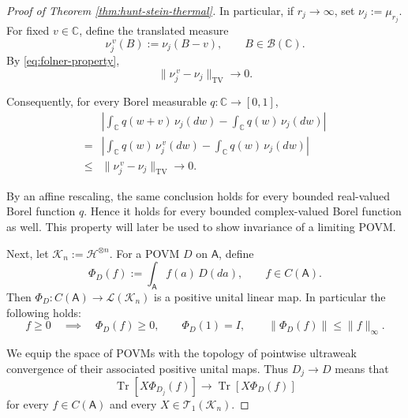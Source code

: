 \documentclass{article}
\theoremstyle{named}
\theoremstyle{named1}
\newcommand{\Tr}{\operatorname{Tr}}
\newcommand{\bbC}{\mathbb C}
\newcommand{\cH}{\mathcal H}
\theoremstyle{plain}
\theoremstyle{remark}
\begin{document}
\begin{proof}[Proof of Theorem \ref{thm:hunt-stein-thermal}]
In particular, if \(r_j\to\infty\), set
\(\nu_j:=\mu_{r_j}\). For fixed \(v\in\bbC\), define the translated
measure
\[
    \nu_j^{\,v}(B):=\nu_j(B-v),
    \qquad B\in\mathcal B(\bbC).
\]
By \eqref{eq:folner-property},
\[
    \|\nu_j^{\,v}-\nu_j\|_{\mathrm{TV}}
    \rightarrow0.
\]

Consequently, for every Borel measurable
\(q:\bbC\to[0,1]\),
\begin{align}
&\left|
    \int_{\bbC}q(w+v)\,\nu_j(dw)
    -
    \int_{\bbC}q(w)\,\nu_j(dw)
\right|
\nonumber\\
=&
\left|
    \int_{\bbC}q(w)\,\nu_j^{\,v}(dw)
    -
    \int_{\bbC}q(w)\,\nu_j(dw)
\right|
\nonumber\\
\leq &
\|\nu_j^{\,v}-\nu_j\|_{\mathrm{TV}}
\rightarrow0.
\label{eq:bounded-function-asymptotic-invariance}
\end{align}


By an affine rescaling, the same conclusion holds for every bounded
real-valued Borel function \(q\). Hence it holds for every bounded
complex-valued Borel function as well. This property will later be used to show invariance of a limiting POVM.

Next, let
 $\mathcal K_n:=\cH^{\otimes n}.$
For a POVM \(D\) on \(\mathsf A\), define
\begin{equation}
    \Phi_D(f)
    :=
    \int_{\mathsf A}f(a)\,D(da),
    \qquad
    f\in C(\mathsf A).
    \label{eq:povm-positive-unital-map}
\end{equation}
Then
$\Phi_D:C(\mathsf A)\rightarrow\mathcal L(\mathcal K_n)$
is a positive unital linear map. In particular the following holds:
\begin{equation}
    f\geq0
    \quad\implies\quad
    \Phi_D(f)\geq0,
    \qquad
    \Phi_D(1)=I,  \qquad \|\Phi_D(f)\|
    \leq
    \|f\|_\infty.
    \label{eq:positive-unital-properties}
\end{equation}



We equip the space of POVMs with the topology of pointwise ultraweak
convergence of their associated positive unital maps. Thus
$ D_j\rightarrow D$
means that
\begin{equation}
    \Tr\!\left[
        X\Phi_{D_j}(f)
    \right]
    \rightarrow
    \Tr\!\left[
        X\Phi_D(f)
    \right]
    \label{eq:povm-topology}
\end{equation}
for every \(f\in C(\mathsf A)\) and every
\(X\in\mathcal T_1(\mathcal K_n)\).


\end{proof}
\end{document}
